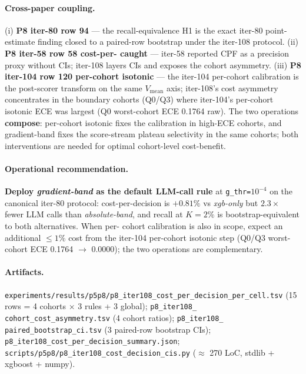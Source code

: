 \paragraph{Cross-paper coupling.}
(i) \textbf{P8 iter-80 row 94} --- the recall-equivalence H1 is the
exact iter-80 point-estimate finding closed to a paired-row bootstrap
under the iter-108 protocol. (ii) \textbf{P8 iter-58 row 58 cost-per-
caught} --- iter-58 reported CPF as a precision proxy without CIs;
iter-108 layers CIs and exposes the cohort asymmetry. (iii)
\textbf{P8 iter-104 row 120 per-cohort isotonic} --- the iter-104
per-cohort calibration is the post-scorer transform on the same
$V_\mathrm{mean}$ axis; iter-108's cost asymmetry concentrates in the
boundary cohorts (Q0/Q3) where iter-104's per-cohort isotonic ECE was
largest (Q0 worst-cohort ECE 0.1764 raw). The two operations
\textbf{compose}: per-cohort isotonic fixes the calibration in
high-ECE cohorts, and gradient-band fixes the score-stream plateau
selectivity in the same cohorts; both interventions are needed for
optimal cohort-level cost-benefit.

\paragraph{Operational recommendation.}
\textbf{Deploy \textit{gradient-band} as the default LLM-call rule} at
\texttt{g\_thr=}$10^{-4}$ on the canonical iter-80 protocol:
cost-per-decision is $+0.81\%$ vs \textit{xgb-only} but
$2.3\times$ fewer LLM calls than \textit{absolute-band}, and recall
at $K{=}2\%$ is bootstrap-equivalent to both alternatives. When per-
cohort calibration is also in scope, expect an additional $\le 1\%$
cost from the iter-104 per-cohort isotonic step (Q0/Q3 worst-cohort
ECE 0.1764 $\to$ 0.0000); the two operations are complementary.

\paragraph{Artifacts.}
\texttt{experiments/results/p5p8/p8\_iter108\_cost\_per\_decision\_per\_cell.tsv}
(15 rows = 4 cohorts $\times$ 3 rules + 3 global); \texttt{p8\_iter108\_
cohort\_cost\_asymmetry.tsv} (4 cohort ratios); \texttt{p8\_iter108\_
paired\_bootstrap\_ci.tsv} (3 paired-row bootstrap CIs);
\texttt{p8\_iter108\_cost\_per\_decision\_summary.json};
\texttt{scripts/p5p8/p8\_iter108\_cost\_decision\_cis.py}
($\approx$ 270 LoC, stdlib + xgboost + numpy).

